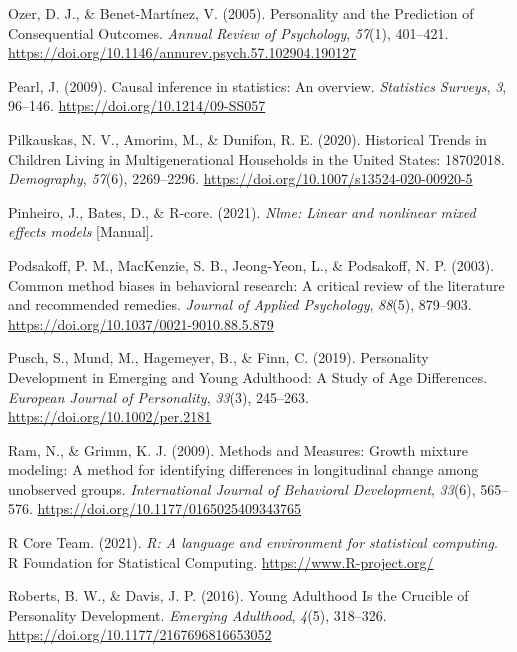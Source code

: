 \documentclass[
  english,
  man, noextraspace]{apa7}
\begin{document}
\leavevmode\hypertarget{ref-ozerPersonalityPredictionConsequential2005}{}%
Ozer, D. J., \& Benet-Martínez, V. (2005). Personality and the Prediction of Consequential Outcomes. \emph{Annual Review of Psychology}, \emph{57}(1), 401--421. \url{https://doi.org/10.1146/annurev.psych.57.102904.190127}

\leavevmode\hypertarget{ref-pearlCausalInferenceStatistics2009}{}%
Pearl, J. (2009). Causal inference in statistics: An overview. \emph{Statistics Surveys}, \emph{3}, 96--146. \url{https://doi.org/10.1214/09-SS057}

\leavevmode\hypertarget{ref-pilkauskasHistoricalTrendsChildren2020}{}%
Pilkauskas, N. V., Amorim, M., \& Dunifon, R. E. (2020). Historical Trends in Children Living in Multigenerational Households in the United States: 18702018. \emph{Demography}, \emph{57}(6), 2269--2296. \url{https://doi.org/10.1007/s13524-020-00920-5}

\leavevmode\hypertarget{ref-R-nlme}{}%
Pinheiro, J., Bates, D., \& R-core. (2021). \emph{Nlme: Linear and nonlinear mixed effects models} {[}Manual{]}.

\leavevmode\hypertarget{ref-podsakoffCommonMethodBiases2003}{}%
Podsakoff, P. M., MacKenzie, S. B., Jeong-Yeon, L., \& Podsakoff, N. P. (2003). Common method biases in behavioral research: A critical review of the literature and recommended remedies. \emph{Journal of Applied Psychology}, \emph{88}(5), 879--903. \url{https://doi.org/10.1037/0021-9010.88.5.879}

\leavevmode\hypertarget{ref-puschPersonalityDevelopmentEmerging2019}{}%
Pusch, S., Mund, M., Hagemeyer, B., \& Finn, C. (2019). Personality Development in Emerging and Young Adulthood: A Study of Age Differences. \emph{European Journal of Personality}, \emph{33}(3), 245--263. \url{https://doi.org/10.1002/per.2181}

\leavevmode\hypertarget{ref-ramMethodsMeasuresGrowth2009}{}%
Ram, N., \& Grimm, K. J. (2009). Methods and Measures: Growth mixture modeling: A method for identifying differences in longitudinal change among unobserved groups. \emph{International Journal of Behavioral Development}, \emph{33}(6), 565--576. \url{https://doi.org/10.1177/0165025409343765}

\leavevmode\hypertarget{ref-R-base}{}%
R Core Team. (2021). \emph{R: A language and environment for statistical computing}. R Foundation for Statistical Computing. \url{https://www.R-project.org/}

\leavevmode\hypertarget{ref-robertsYoungAdulthoodCrucible2016}{}%
Roberts, B. W., \& Davis, J. P. (2016). Young Adulthood Is the Crucible of Personality Development. \emph{Emerging Adulthood}, \emph{4}(5), 318--326. \url{https://doi.org/10.1177/2167696816653052}
\end{document}
